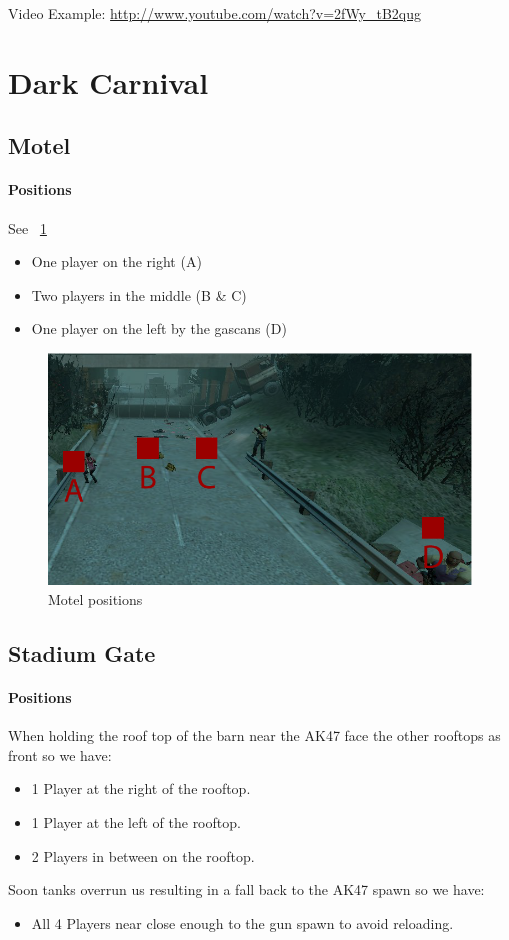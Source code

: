 Video Example: \url{http://www.youtube.com/watch?v=2fWy_tB2qug}

\section{Dark Carnival}

\subsection{Motel}
\paragraph{Positions} See \figurename\ \ref{fig:motel_positions}
\begin{itemize}
\item One player on the right (A)
\item Two players in the middle (B \& C)
\item One player on the left by the gascans (D)
\end{itemize}
\begin{figure}[htb!]
\centering
\includegraphics[width=0.7\columnwidth]{motel/motel_positions}
\caption{Motel positions}
\label{fig:motel_positions}
\end{figure}

\subsection{Stadium Gate}
\paragraph{Positions}
When holding the roof top of the barn near the AK47 face the other rooftops as front so we have:
\begin{itemize}
\item 1 Player at the right of the rooftop.
\item 1 Player at the left of the rooftop.
\item 2 Players in between on the rooftop.
\end{itemize}
Soon tanks overrun us resulting in a fall back to the AK47 spawn so we have:
\begin{itemize}
\item All 4 Players near close enough to the gun spawn to avoid reloading.
\end{itemize}


